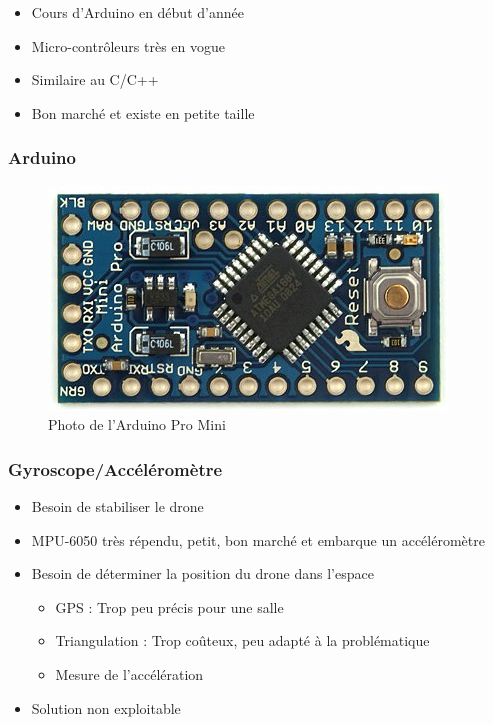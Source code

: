 \documentclass{beamer}
\begin{document}
{\begin{frame}
	  \begin{itemize}
	    \item Cours d'Arduino en début d'année
	    \item Micro-contrôleurs très en vogue
	    \item Similaire au C/C++
	    \item Bon marché et existe en petite taille
	  \end{itemize}
	\end{frame}
	
	\begin{frame}
	  \frametitle{Arduino}
	  
	  \begin{figure}[htbp]
	    \centering
	    \includegraphics[scale=0.2]{img/arduinopromini.jpg}
	    \caption{Photo de l'Arduino Pro Mini}
	  \end{figure} 
	\end{frame}
	
	\begin{frame} %
	  \frametitle{Gyroscope/Accéléromètre}
	
	  \begin{itemize}
	    \item Besoin de stabiliser le drone
	    \item MPU-6050 très répendu, petit, bon marché et embarque un accéléromètre
	    \item Besoin de déterminer la position du drone dans l'espace
	    \begin{itemize}
	      \item GPS : Trop peu précis pour une salle
	      \item Triangulation : Trop coûteux, peu adapté à la problématique
	      \item Mesure de l'accélération
	    \end{itemize}
	    \item Solution non exploitable
	  \end{itemize}
	\end{frame}
	
}
\end{document}
